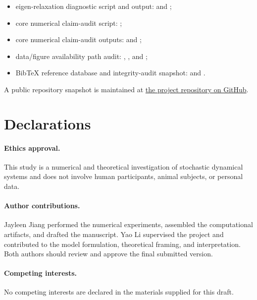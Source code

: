 \documentclass[11pt,a4paper]{article}
\theoremstyle{definition}
\numberwithin{equation}{section}   %
\begin{document}
\begin{itemize}[leftmargin=*]
  \item eigen-relaxation diagnostic script and output:
   and
  ;
  \item core numerical claim-audit script:
  ;
  \item core numerical claim-audit outputs:
   and
  ;
  \item data/figure availability path audit:
  ,
  , and
  ;
  \item BibTeX reference database and integrity-audit snapshot:
   and
  .
\end{itemize}
\endgroup
A public repository snapshot is maintained at
\href{https://github.com/jayleenjiang/nls-energy-cascade}{the project
repository on GitHub}.

\section*{Declarations}

\paragraph{Ethics approval.}
This study is a numerical and theoretical investigation of stochastic
dynamical systems and does not involve human participants, animal subjects, or
personal data.

\paragraph{Author contributions.}
Jayleen Jiang performed the numerical experiments, assembled the computational
artifacts, and drafted the manuscript. Yao Li supervised the project and
contributed to the model formulation, theoretical framing, and interpretation.
Both authors should review and approve the final submitted version.

\paragraph{Competing interests.}
No competing interests are declared in the materials supplied for this draft.
\end{document}
